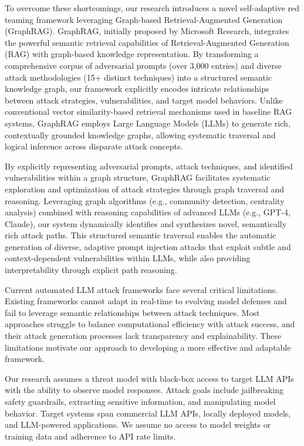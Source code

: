 To overcome these shortcomings, our research introduces a novel self-adaptive red teaming framework leveraging Graph-based Retrieval-Augmented Generation (GraphRAG). GraphRAG, initially proposed by Microsoft Research, integrates the powerful semantic retrieval capabilities of Retrieval-Augmented Generation (RAG) with graph-based knowledge representation. By transforming a comprehensive corpus of adversarial prompts (over 3,000 entries) and diverse attack methodologies (15+ distinct techniques) into a structured semantic knowledge graph, our framework explicitly encodes intricate relationships between attack strategies, vulnerabilities, and target model behaviors. Unlike conventional vector similarity-based retrieval mechanisms used in baseline RAG systems, GraphRAG employs Large Language Models (LLMs) to generate rich, contextually grounded knowledge graphs, allowing systematic traversal and logical inference across disparate attack concepts.

By explicitly representing adversarial prompts, attack techniques, and identified vulnerabilities within a graph structure, GraphRAG facilitates systematic exploration and optimization of attack strategies through graph traversal and reasoning. Leveraging graph algorithms (e.g., community detection, centrality analysis) combined with reasoning capabilities of advanced LLMs (e.g., GPT-4, Claude), our system dynamically identifies and synthesizes novel, semantically rich attack paths. This structured semantic traversal enables the automatic generation of diverse, adaptive prompt injection attacks that exploit subtle and context-dependent vulnerabilities within LLMs, while also providing interpretability through explicit path reasoning.

Current automated LLM attack frameworks face several critical limitations. Existing frameworks cannot adapt in real-time to evolving model defenses and fail to leverage semantic relationships between attack techniques. Most approaches struggle to balance computational efficiency with attack success, and their attack generation processes lack transparency and explainability. These limitations motivate our approach to developing a more effective and adaptable framework.

Our research assumes a threat model with black-box access to target LLM APIs with the ability to observe model responses. Attack goals include jailbreaking safety guardrails, extracting sensitive information, and manipulating model behavior. Target systems span commercial LLM APIs, locally deployed models, and LLM-powered applications. We assume no access to model weights or training data and adherence to API rate limits.

